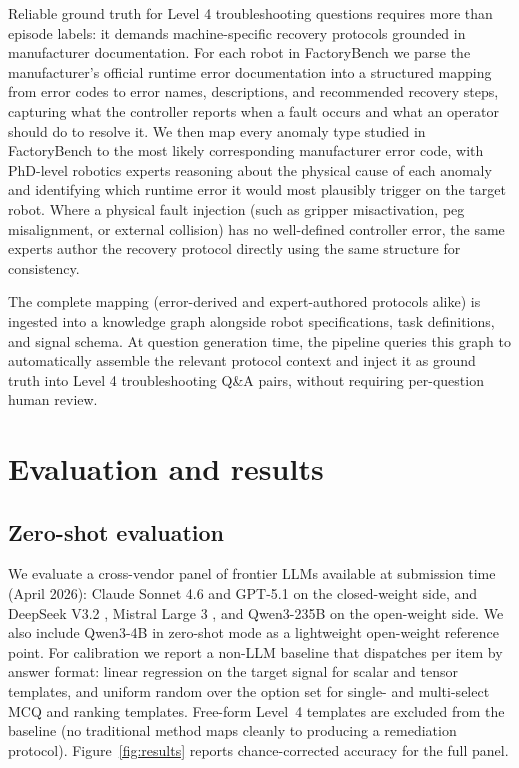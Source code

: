 \documentclass{article}
\begin{document}
Reliable ground truth for Level 4 troubleshooting questions requires more than episode labels: it demands machine-specific recovery protocols grounded in manufacturer documentation. For each robot in FactoryBench we parse the manufacturer's official runtime error documentation into a structured mapping from error codes to error names, descriptions, and recommended recovery steps, capturing what the controller reports when a fault occurs and what an operator should do to resolve it. We then map every anomaly type studied in FactoryBench to the most likely corresponding manufacturer error code, with PhD-level robotics experts reasoning about the physical cause of each anomaly and identifying which runtime error it would most plausibly trigger on the target robot. Where a physical fault injection (such as gripper misactivation, peg misalignment, or external collision) has no well-defined controller error, the same experts author the recovery protocol directly using the same structure for consistency.

The complete mapping (error-derived and expert-authored protocols alike) is ingested into a knowledge graph alongside robot specifications, task definitions, and signal schema. At question generation time, the pipeline queries this graph to automatically assemble the relevant protocol context and inject it as ground truth into Level 4 troubleshooting Q\&A pairs, without requiring per-question human review.



\section{Evaluation and results}

\subsection{Zero-shot evaluation}
\label{sec:zero-shot}

We evaluate a cross-vendor panel of frontier LLMs available at submission time (April 2026): Claude Sonnet 4.6 \cite{anthropic2025sonnet46} and GPT-5.1 \cite{openai2025gpt51} on the closed-weight side, and DeepSeek V3.2 \cite{deepseek2025v32}, Mistral Large 3 \cite{mistral2025large3}, and Qwen3-235B \cite{qwen2025qwen3} on the open-weight side. We also include Qwen3-4B \cite{qwen2025qwen3} in zero-shot mode as a lightweight open-weight reference point. For calibration we report a non-LLM baseline that dispatches per item by answer format: linear regression on the target signal for scalar and tensor templates, and uniform random over the option set for single- and multi-select MCQ and ranking templates. Free-form Level~4 templates are excluded from the baseline (no traditional method maps cleanly to producing a remediation protocol). Figure~\ref{fig:results} reports chance-corrected accuracy for the full panel.
\end{document}
